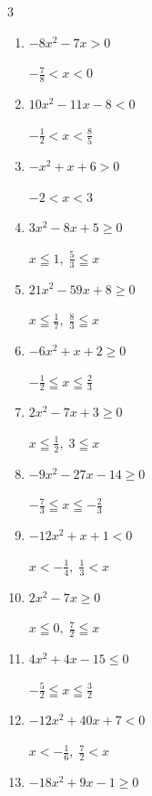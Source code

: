 \begin{multicols}{3}
\begin{enumerate}
  \item $-8x^{2}-7x>0$

        $\displaystyle -\frac{7}{8} < x < 0$

  \item $10x^{2}-11x-8<0$

        $\displaystyle -\frac{1}{2} < x < \frac{8}{5}$

  \item $-x^{2}+x+6>0$

        $\displaystyle -2 < x < 3$

  \item $3x^{2}-8x+5\geq 0$

        $\displaystyle x \leqq 1 , \; \frac{5}{3} \leqq x$

  \item $21x^{2}-59x+8\geq 0$

        $\displaystyle x \leqq \frac{1}{7} , \; \frac{8}{3} \leqq x$

  \item $-6x^{2}+x+2\geq 0$

        $\displaystyle -\frac{1}{2} \leqq x \leqq \frac{2}{3}$

\columnbreak %

\resetques

  \item $2x^{2}-7x+3\geq 0$

        $\displaystyle x \leqq \frac{1}{2} , \; 3 \leqq x$

  \item $-9x^{2}-27x-14\geq 0$

        $\displaystyle -\frac{7}{3} \leqq x \leqq -\frac{2}{3}$

  \item $-12x^{2}+x+1<0$

        $\displaystyle x < -\frac{1}{4} , \; \frac{1}{3} < x$

  \item $2x^{2}-7x\geq 0$

        $\displaystyle x \leqq 0 , \; \frac{7}{2} \leqq x$

  \item $4x^{2}+4x-15\leq 0$

        $\displaystyle -\frac{5}{2} \leqq x \leqq \frac{3}{2}$

  \item $-12x^{2}+40x+7<0$

        $\displaystyle x < -\frac{1}{6} , \; \frac{7}{2} < x$

  \item $-18x^{2}+9x-1\geq 0$


\end{enumerate}
\end{multicols}
